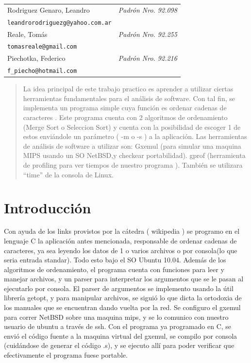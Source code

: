 \begin{flushleft}
{\renewcommand{\arraystretch}{2.5}
\renewcommand{\tabcolsep}{1.2cm}
\begin{tabular}{ l l }
  Rodriguez Genaro, Leandro & \textit{Padrón Nro. 92.098} \\
  \texttt{leandrorodriguezg@yahoo.com.ar} \\
  \hline
  Reale, Tomás & \textit{Padrón Nro. 92.255} \\
  \texttt{tomasreale@gmail.com} \\
  \hline
  Piechotka, Federico & \textit{Padrón Nro. 92.216} \\
  \texttt{f\_piecho@hotmail.com} \\
  \hline
\end{tabular}}
\end{flushleft}


\thispagestyle{empty}

\newpage

\begin{abstract}
La idea principal de este trabajo practico es aprender a utilizar ciertas herramientas fundamentales
para el análisis de software. Con tal fin, se implementa un programa simple cuya función es ordenar	
cadenas de caracteres . Este programa cuenta con 2 algoritmos de ordenamiento 
(Merge Sort o Seleccion Sort) y cuenta con la posibilidad de escoger 1 de estos enviándole un parámetro ( -m o -s ) a la aplicación.
Las herramientas de análisis de software a utilizar son:   
Gxemul (para simular una maquina MIPS usando un SO NetBSD,y checkear portabilidad).
gprof (herramienta de profiling para ver tiempos de nuestro programa ).
También se utilizara “time” de la consola de Linux.
\end{abstract}

\section{Introducción}
Con ayuda de los links provistos por la cátedra ( wikipedia ) se programo en el lenguaje C la aplicación antes mencionada, responsable de ordenar cadenas de caracteres, ya sea leyendo los datos de 1 o varios archivos o por consola(lo que seria entrada standar). Todo esto bajo el SO Ubuntu 10.04.
Además de los algoritmos de ordenamiento, el programa cuenta con funciones para leer y manejar archivos, y un parser para interpretar los argumentos que se le pasan al ejecutarlo por consola.
El parser de argumentos se implemento usando la útil librería getopt, y para manipular archivos, se siguió lo que dicta la ortodoxia de los manuales que se encuentran dando vuelta por la red.
Se configuro el gxemul para correr NetBSD sobre una maquina mips, y se lo comunico con nuestro usuario de ubuntu a través de ssh.
Con el programa ya programado en C, se envió el código fuente a la maquina virtual del gxemul, se compilo por consola (cuidándose de generar el código .s), y se ejecuto allí para poder verificar que efectivamente el programa fuese portable.

